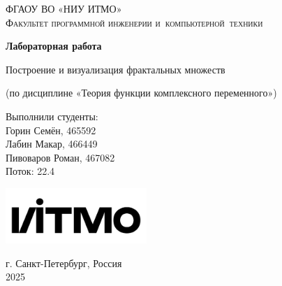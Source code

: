 \begin{titlepage}
    \begin{center}
        \large
        \textsc{ФГАОУ ВО «НИУ ИТМО»\\
        Факультет программной инженерии и~компьютерной~техники}
        \vspace*{4cm}
            
        \Huge
        \textbf{Лабораторная работа}
            
        \vspace{0.5cm}
        \LARGE
        Построение и визуализация фрактальных множеств
            
        \vspace{0.5cm}
        \large
        (по дисциплине «Теория функции комплексного переменного»)

        \vspace{1.5cm}

        \hfill\Large
        \begin{minipage}{.45\textwidth}
        Выполнили студенты:\\[2mm]
        Горин Семён, 465592\\
        Лабин Макар, 466449\\
        Пивоваров Роман, 467082\\[2mm]
        Поток: 22.4
        \end{minipage}%
            
        \vfill
            
        \vspace{0.8cm}
            
        \includegraphics[width=0.4\textwidth]{itmo}
            
        \Large
        г. Санкт-Петербург, Россия\\
        2025
            
    \end{center}
\end{titlepage}